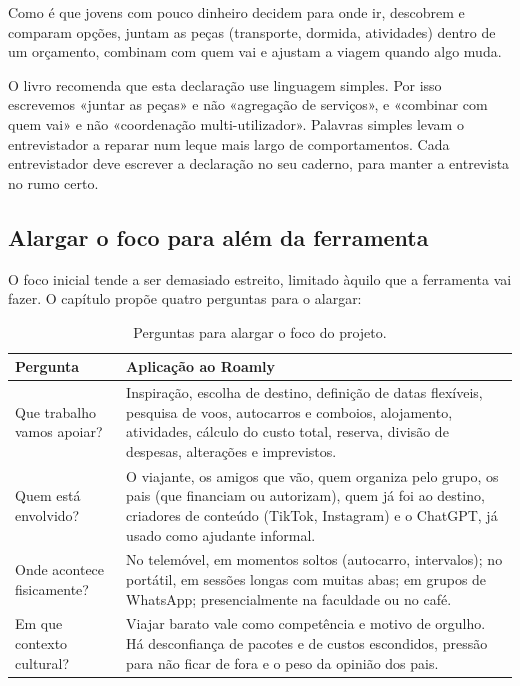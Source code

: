 \documentclass[11pt,a4paper]{article}
\begin{document}
\begin{foco}
Como é que jovens com pouco dinheiro decidem para onde ir, descobrem e comparam opções, juntam as peças (transporte, dormida, atividades) dentro de um orçamento, combinam com quem vai e ajustam a viagem quando algo muda.
\end{foco}

O livro recomenda que esta declaração use linguagem simples. Por isso escrevemos «juntar as peças» e não «agregação de serviços», e «combinar com quem vai» e não «coordenação multi-utilizador». Palavras simples levam o entrevistador a reparar num leque mais largo de comportamentos. Cada entrevistador deve escrever a declaração no seu caderno, para manter a entrevista no rumo certo.

\subsection{Alargar o foco para além da ferramenta}

O foco inicial tende a ser demasiado estreito, limitado àquilo que a ferramenta vai fazer. O capítulo propõe quatro perguntas para o alargar:

\begin{table}[h]
\centering
\begin{tabularx}{\textwidth}{@{}p{3.6cm}L@{}}
\toprule
\textbf{Pergunta} & \textbf{Aplicação ao Roamly} \\
\midrule
Que trabalho vamos apoiar? & Inspiração, escolha de destino, definição de datas flexíveis, pesquisa de voos, autocarros e comboios, alojamento, atividades, cálculo do custo total, reserva, divisão de despesas, alterações e imprevistos. \\
Quem está envolvido? & O viajante, os amigos que vão, quem organiza pelo grupo, os pais (que financiam ou autorizam), quem já foi ao destino, criadores de conteúdo (TikTok, Instagram) e o ChatGPT, já usado como ajudante informal. \\
Onde acontece fisicamente? & No telemóvel, em momentos soltos (autocarro, intervalos); no portátil, em sessões longas com muitas abas; em grupos de WhatsApp; presencialmente na faculdade ou no café. \\
Em que contexto cultural? & Viajar barato vale como competência e motivo de orgulho. Há desconfiança de pacotes e de custos escondidos, pressão para não ficar de fora e o peso da opinião dos pais. \\
\bottomrule
\end{tabularx}
\caption{Perguntas para alargar o foco do projeto.}
\end{table}
\end{document}

